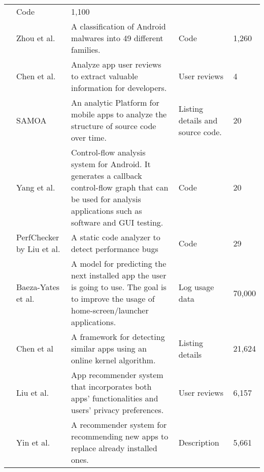 \begin{longtable}{| c | p{3cm} | p{6cm} | p{2cm} | p{1.5cm} |}
	& Code
	& 1,100
	\tabularnewline
	\cline{2-5}
	& Zhou et al.\cite{zhou_2012_SP_dissecting}
	& A classification of Android malwares into 49 different families.
	& Code
	& 1,260
	\tabularnewline
	\hline
	\multirow{4}{*}{\rotatebox{90}{\kern-3em Software Engineering}} 
	& Chen et al. \cite{chen_2014_ICSE}
	& Analyze app user reviews to extract valuable information for developers.
	& User reviews
	& 4
	\tabularnewline
	\cline{2-5}
	& SAMOA \cite{Minelli_2013_CMSREuro}
	& An analytic Platform for mobile apps to analyze the structure of source code over time.
	& Listing details and source code.
	& 20
	\tabularnewline
	\cline{2-5}
	& Yang et al. \cite{Yang_2015_ICSE}
	& Control-flow analysis system for Android. It generates a callback control-flow graph that can be used for analysis applications such as software and GUI testing.
	& Code
	& 20
	\tabularnewline
	\cline{2-5}
	& PerfChecker by Liu et al. \cite{Liu_2014_ICSE}
	& A static code analyzer to detect performance bugs
	& Code
	& 29
	\tabularnewline
	\cline{2-5}
	\hline
	\multirow{4}{*}{\rotatebox{90}{\kern-14em Machine Learning}} 
	& Baeza-Yates et al. \cite{Baeza-Yates_2015_WSDM}
	& A model for predicting the next installed app the user is going to use. The goal is to improve the usage of home-screen/launcher applications.
	& Log usage data
	& 70,000
	\tabularnewline
	\cline{2-5}
	& Chen et al \cite{Chen_2015_WSDM} 
	& A framework for detecting similar apps using an online kernel algorithm.
	& Listing details
	& 21,624
	\tabularnewline
	\cline{2-5}
	& Liu et al.\cite{Liu_2015_WSDM}
	& App recommender system that incorporates both apps' functionalities and users' privacy preferences.
	& User reviews
	& 6,157
	\tabularnewline
	\cline{2-5}
	& Yin et al. \cite{Yin_2013_WSDM}
	& A recommender system for recommending new apps to replace already installed ones.
	& Description
	& 5,661
	\\
	\hline
\end{longtable}
